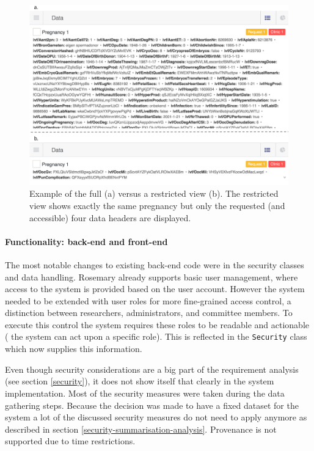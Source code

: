 \begin{figure}[ht]
	\centering
	\includegraphics[width=1.0\linewidth]{images/datasets-example-edit}
	\caption{
		Example of the full \projectdata{} (a) versus a restricted view (b).
		The restricted view shows exactly the same pregnancy but only the requested (and accessible) four data headers are displayed.
	}
	\label{fig:dataset-example}
\end{figure}

\paragraph{Functionality: back-end and front-end}
The most notable changes to existing back-end code were in the security classes and data handling.
Rosemary already supports basic user management, where access to the system is provided based on the user account.
However the system needed to be extended with user roles for more fine-grained access control, \ie{} a distinction between researchers, administrators, and committee members.
To execute this control the system requires these roles to be readable and actionable (\ie{} the system can act upon a specific role).
This is reflected in the {\tt Security} class which now supplies this information.

Even though security considerations are a big part of the requirement analysis (see section \ref{security}), it does not show itself that clearly in the system implementation.
Most of the security measures were taken during the data gathering steps.
Because the decision was made to have a fixed dataset for the system a lot of the discussed security measures do not need to apply anymore as described in section \ref{security-summarisation-analysis}.
Provenance is not supported due to time restrictions.

